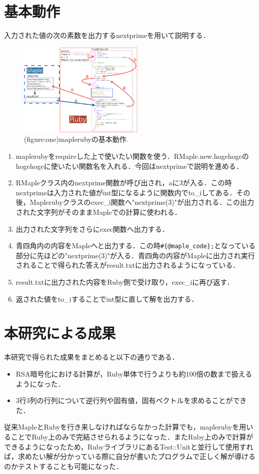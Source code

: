 \documentclass[10pt,a4j,twocolumn]{jsarticle}
\begin{document}
\section{基本動作}
入力された値の次の素数を出力するnextprimeを用いて説明する．
\begin{figure}\begin{center}
\includegraphics[width=6cm, bb=0 0  937 753]{./mapleruby_eringi.003.png}
\caption{(figure:one)maplerubyの基本動作.}
\label{default}\end{center}\end{figure}
\begin{enumerate}
\item maplerubyをrequireした上で使いたい関数を使う．RMaple.new.hogehogeのhogehogeに使いたい関数名を入れる．今回はnextprimeで説明を進める．
\item RMapleクラス内のnextprime関数が呼び出され，aに3が入る．この時nextprimeは入力された値がint型になるように関数内でto\_iしてある．その後，Maplerubyクラスのexec\_i関数へ"nextprime(3)"が出力される．この出力された文字列がそのままMapleでの計算に使われる．
\item 出力された文字列をさらにexec関数へ出力する．
\item 青四角内の内容をMapleへと出力する．この時\verb|#{@maple_code};|となっている部分に先ほどの"nextprime(3)"が入る．青四角の内容がMapleに出力され実行されることで得られた答えがresult.txtに出力されるようになっている．
\item result.txtに出力された内容をRuby側で受け取り，exec\_iに再び返す．
\item 返された値をto\_iすることでint型に直して解を出力する．
\end{enumerate}
\section{本研究による成果}
本研究で得られた成果をまとめると以下の通りである．

\begin{itemize}
\item RSA暗号化における計算が，Ruby単体で行うよりも約100倍の数まで扱えるようになった．
\item 3行3列の行列について逆行列や固有値，固有ベクトルを求めることができた．
\end{itemize}
従来MapleとRubyを行き来しなければならなかった計算でも，maplerubyを用いることでRuby上のみで完結させられるようになった．またRuby上のみで計算ができるようになったため，RubyライブラリにあるTest::Unitと並行して使用すれば，求めたい解が分かっている際に自分が書いたプログラムで正しく解が導けるのかテストすることも可能になった．
\end{document}
